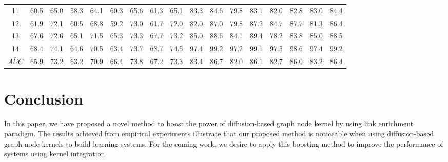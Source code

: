\documentclass[runningheads,a4paper]{llncs}
\begin{document}
\begin{table*}[!htbp]
\begin{tabular}{|c|c|g|c|g|c|g|c|g|c|g|c|g|c|g|c|g|}
11 & 60.5 & 65.0 & 58.3 & 64.1 & 60.3 & 65.6 & 61.3 & 65.1 & 83.3 & 84.6 & 79.8 & 83.1 & 82.0 & 82.8 & 83.0 & 84.4 \\
12 & 61.9 & 72.1 & 60.5 & 68.8 & 59.2 & 73.0 & 61.7 & 72.0 & 82.0 & 87.0 & 79.8 & 87.2 & 84.7 & 87.7 & 81.3 & 86.4 \\
13 & 67.6 & 72.6 & 65.1 & 71.5 & 65.3 & 73.3 & 67.7 & 73.2 & 85.0 & 88.6 & 84.1 & 89.4 & 78.2 & 83.8 & 85.0 & 88.5 \\
14 & 68.4 & 74.1 & 64.6 & 70.5 & 63.4 & 73.7 & 68.7 & 74.5 & 97.4 & 99.2 & 97.2 & 99.1 & 97.5 & 98.6 & 97.4 & 99.2 \\
\hline
$\overline{AUC}$ & 65.9 & 73.2 & 63.2 & 70.9 & 66.4 & 73.8 & 67.2 & 73.3 & 83.4 & 86.7 & 82.0 & 86.1 & 82.7 & 86.0 & 83.2 & 86.4 \\
\hline
\end{tabular}
\end{table*}
\section{Conclusion}
\label{conclusion}
In this paper, we have proposed a novel method to boost the power of diffusion-based graph node kernel by using link enrichment paradigm. The results achieved from empirical experiments illustrate that our proposed method is noticeable when using diffusion-based graph node kernels to build learning systems. For the coming work, we desire to apply this boosting method to improve the performance of systems using kernel integration.


% 
% 
\end{document}
